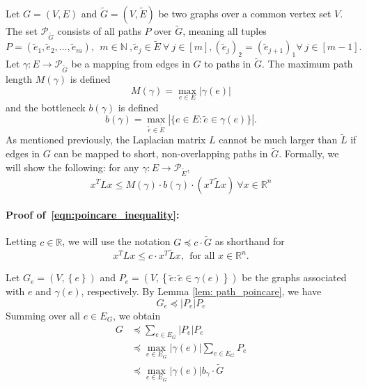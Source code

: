 \documentclass{article}
\newcommand{\Reals}{\mathbb{R}}
\newcommand{\abs}[1]{\left \lvert #1 \right \rvert}
\newcommand{\set}[1]{\left\{#1\right\}}
\newcommand{\1}{\mathbf{1}}
\newcommand{\wt}[1]{\widetilde{#1}}
\theoremstyle{alden}
\theoremstyle{aldenthm}
\theoremstyle{definition}
\theoremstyle{remark}
\begin{document}
Let $G = (V,E)$ and $\wt{G} = (V,\wt{E})$ be two graphs over a common vertex set $V$. The set $\mathcal{P}_{\wt{G}}$ consists of all paths $P$ over $\wt{G}$, meaning all tuples
\begin{equation*}
P = (\wt{e}_1,\wt{e}_2,\ldots,\wt{e}_m),~~m \in \mathbb{N}~, \wt{e}_j \in \wt{E}~ \forall~ j \in [m], (\wt{e}_j)_2 = (\wt{e}_{j + 1})_1 \forall~j \in [m - 1].
\end{equation*}
Let $\gamma:E \to \mathcal{P}_{\wt{G}}$ be a mapping from edges in $G$ to paths in $\wt{G}$. The maximum path length $M(\gamma)$ is defined
\begin{equation*}
M(\gamma) = \max_{e \in E} \abs{\gamma(e)}
\end{equation*} 
and the bottleneck $b(\gamma)$ is defined
\begin{equation*}
b(\gamma) = \max_{\wt{e} \in \wt{E}} \abs{\{e \in E:  \wt{e} \in \gamma(e)\}}.
\end{equation*}
As mentioned previously, the Laplacian matrix $L$ cannot be much larger than $\wt{L}$ if edges in $G$ can be mapped to short, non-overlapping paths in $\wt{G}$. Formally, we will show the following: for any $\gamma: E \to \mathcal{P}_{\wt{E}}$,
\begin{equation}
\label{eqn:poincare_inequality}
x^T L x \leq M(\gamma)\cdot b(\gamma) \cdot (x^T \wt{L} x)~\forall{x \in \Reals^n}
\end{equation} 

\paragraph{Proof of~\eqref{eqn:poincare_inequality}:}

Letting $c \in \Reals$, we will use the notation $G \preceq c \cdot  \wt{G}$ as shorthand for
\begin{equation*}
x^T L x \leq c \cdot  x^T \wt{L} x,~~\textrm{for all $x \in \Reals^n$}.
\end{equation*}


Let $G_e = (V, \set{e})$ and $P_e = (V, \set{\widetilde{e}: \widetilde{e} \in \gamma(e)})$ be the graphs associated with $e$ and $\gamma(e)$, respectively. By Lemma \ref{lem: path_poincare}, we have
\begin{equation*}
G_{e} \preceq \abs{P_e} P_e
\end{equation*}
Summing over all $e \in E_G$, we obtain
\begin{align*}
G & \preceq \sum_{e \in E_G} \abs{P_e} P_e \\
& \preceq \max_{e \in E_G} \abs{\gamma(e)} \sum_{e \in E_G} P_e \\
& \preceq \max_{e \in E_G} \abs{\gamma(e)} b_{\gamma}\cdot \widetilde{G}
\end{align*}
\end{document}

